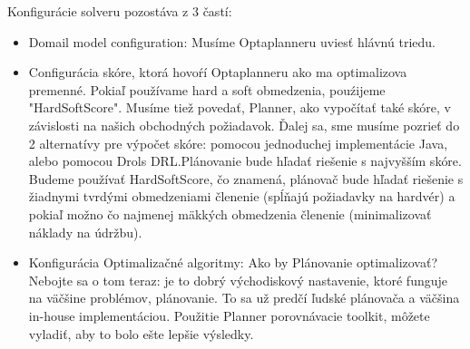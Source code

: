 \newpage
Konfigurácie solveru pozostáva z 3 častí: 
\begin{itemize}
\item Domail model configuration: Musíme Optaplanneru uviesť hlávnú triedu.
\item Configurácia skóre, ktorá hovoŕí Optaplanneru ako ma optimalizova premenné. Pokiaľ používame hard a soft obmedzenia, pouźijeme "HardSoftScore". Musíme tiež povedať, Planner, ako vypočítať také skóre, v závislosti na našich obchodných požiadavok. Ďalej sa, sme musíme  pozrieť do 2 alternatívy pre výpočet skóre: pomocou jednoduchej implementácie Java, alebo pomocou Drols DRL.Plánovanie bude hľadať riešenie s najvyšším skóre. Budeme používať HardSoftScore, čo znamená, plánovač bude hľadať riešenie s žiadnymi tvrdými obmedzeniami členenie (spĺňajú požiadavky na hardvér) a pokiaľ možno čo najmenej mäkkých obmedzenia členenie (minimalizovať náklady na údržbu).
\item Konfigurácia Optimalizačné algoritmy: Ako by Plánovanie optimalizovať? Nebojte sa o tom teraz: je to dobrý východiskový nastavenie, ktoré funguje na väčšine problémov, plánovanie. To sa už predčí ľudské plánovača a väčšina in-house implementáciou. Použitie Planner porovnávacie toolkit, môžete vyladiť, aby to bolo ešte lepšie výsledky.

\end{itemize}

